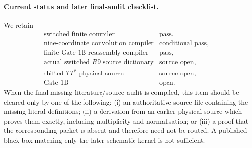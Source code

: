 \documentclass[11pt]{article}
\theoremstyle{definition}
\newcommand{\1}{\mathbf 1}
\begin{document}
\paragraph{Current status and later final-audit checklist.}
We retain
\[
\begin{array}{ll}
 \text{switched finite compiler} & \text{pass},\\
 \text{nine-coordinate convolution compiler} & \text{conditional pass},\\
 \text{finite Gate-1B reassembly compiler} & \text{pass},\\
 \text{actual switched $R9$ source dictionary} & \text{source open},\\
 \text{shifted $TT^*$ physical source} & \text{source open},\\
 \text{Gate 1B} & \text{open}.
\end{array}
\]
When the final missing-literature/source audit is compiled, this item should
be cleared only by one of the following: (i) an authoritative source file
containing the missing literal definitions; (ii) a derivation from an earlier
physical source which proves them exactly, including multiplicity and
normalisation; or (iii) a proof that the corresponding packet is absent and
therefore need not be routed.  A published black box matching only the later
schematic kernel is not sufficient.

\printbibliography
\end{document}
